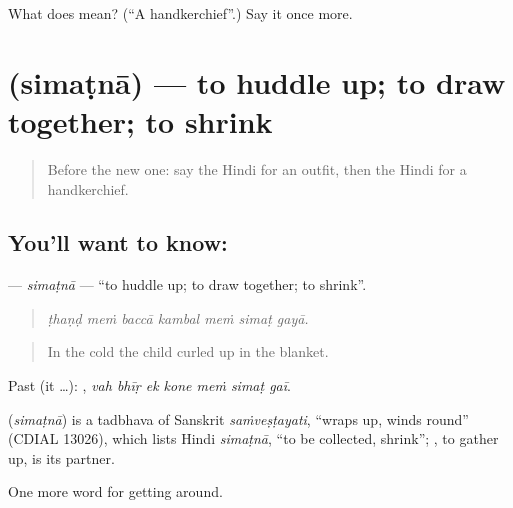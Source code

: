 \begin{tcolorbox}[breakable,colback=teal!4,colframe=teal!35!black,title={Before you move on}]
What does  mean? (\textquotedblleft{}A handkerchief\textquotedblright{}.) Say it once more.
\end{tcolorbox}
\section[\texorpdfstring{\hi{सिमटना} (simaṭnā)}{सिमटना (simaṭnā)}]{ (simaṭnā) — to huddle up; to draw together; to shrink}

\label{lesson:HI-C435-simatna}



\begin{quote}
Before the new one: say the Hindi for an outfit, then the Hindi for a handkerchief.
\end{quote}

\subsection*{You'll want to know: }
\textbf{} — \emph{simaṭnā} — \textquotedblleft{}to huddle up; to draw together; to shrink\textquotedblright{}.

\begin{quote}
      
\end{quote}

\begin{quote}
\emph{ṭhaṇḍ meṁ baccā kambal meṁ simaṭ gayā.}
\end{quote}

\begin{quote}
In the cold the child curled up in the blanket.
\end{quote}

Past (it …):       , \emph{vah bhīṛ ek kone meṁ simaṭ gaī}.

\begin{cousinweb}
\textbf{} (\emph{simaṭnā}) is a tadbhava of Sanskrit \emph{saṁveṣṭayati}, \textquotedblleft{}wraps up, winds round\textquotedblright{} (CDIAL 13026), which lists Hindi \emph{simaṭnā}, \textquotedblleft{}to be collected, shrink\textquotedblright{}; , to gather up, is its partner.
\end{cousinweb}

\begin{grammarlens}[title={What you've built}]
One more word for getting around.
\end{grammarlens}

